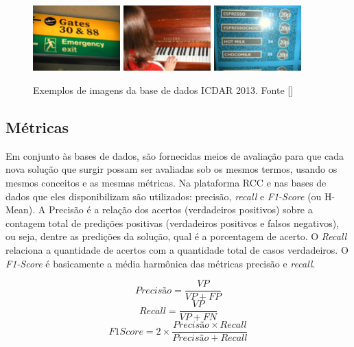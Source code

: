 \begin{figure}
    \centering
    \includegraphics[width=0.3\textwidth]{figs/img_20.jpg}
    \includegraphics[width=0.3\textwidth]{figs/img_85.jpg}
    \includegraphics[width=0.3\textwidth]{figs/img_225.jpg}
    \caption{Exemplos de imagens da base de dados ICDAR 2013. Fonte []}
    \label{fig:icdar2013_examples}
\end{figure}

\subsection{Métricas}\label{sec:methodology_metrics}
Em conjunto às bases de dados, são fornecidas meios de avaliação para que cada nova solução que surgir possam ser avaliadas sob os mesmos termos, 
usando os mesmos conceitos e as mesmas métricas. Na plataforma RCC e nas bases de dados que eles disponibilizam são utilizados: precisão, 
\textit{recall} e \textit{F1-Score} (ou H-Mean). A Precisão é a relação dos acertos (verdadeiros positivos) sobre a contagem total de predições 
positivas (verdadeiros positivos e falsos negativos), ou seja, dentre as predições da solução, qual é a porcentagem de acerto. O \textit{Recall} 
relaciona a quantidade de acertos com a quantidade total de casos verdadeiros. O \textit{F1-Score} é basicamente a média harmônica das métricas 
precisão e \textit{recall}.

\begin{equation}
    Precisão = \frac{VP}{VP + FP}
\end{equation}
\begin{equation}
    Recall = \frac{VP}{VP + FN}
\end{equation}
\begin{equation}
    F1Score = 2 \times \frac{Precisão \times Recall}{Precisão + Recall}
\end{equation}

